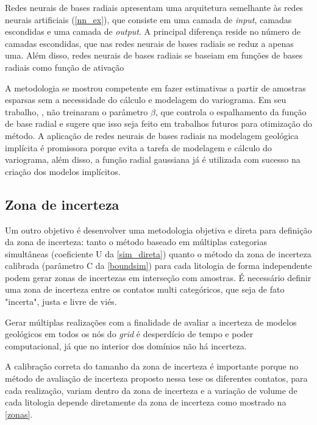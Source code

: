Redes neurais de bases radiais apresentam uma arquitetura semelhante às redes neurais artificiais (\autoref{nn_ex}), que consiste em uma camada de \textit{input}, camadas escondidas e uma camada de \textit{output}. A principal diferença reside no número de camadas escondidas, que nas redes neurais de bases radiais se reduz a apenas uma. Além disso, redes neurais de bases radiais se baseiam em funções de bases radiais como função de ativação 

A metodologia se mostrou competente em fazer estimativas a partir de amostras esparsas sem a necessidade do cálculo e modelagem do variograma. Em seu trabalho, , não treinaram o parâmetro $\beta$, que controla o espalhamento da função de base radial e sugere que isso seja feito em trabalhos futuros para otimização do método. A aplicação de redes neurais de bases radiais na modelagem geológica implícita é promissora porque evita a tarefa de modelagem e cálculo do variograma, além disso, a função radial gaussiana já é utilizada com sucesso na criação dos modelos implícitos. 

\subsection{Zona de incerteza}

Um outro objetivo é desenvolver uma metodologia objetiva e direta para definição da zona de incerteza: tanto o método baseado em múltiplas categorias simultâneas (coeficiente U da \autoref{sim_direta}) quanto o método da zona de incerteza calibrada (parâmetro C da \autoref{boundsim}) para cada litologia de forma independente podem gerar zonas de incertezas em interseção com amostras. É necessário definir uma zona de incerteza entre os contatos multi categóricos, que seja de fato "incerta", justa e livre de viés. 

Gerar múltiplas realizações com a finalidade de avaliar a incerteza de modelos geológicos em todos os nós do \textit{grid} é desperdício de tempo e poder computacional, já que no interior dos domínios não há incerteza. 

A calibração correta do tamanho da zona de incerteza é importante porque no método de avaliação de incerteza proposto nessa tese os diferentes contatos, para cada realização, variam dentro da zona de incerteza e a variação de volume de cada litologia depende diretamente da zona de incerteza como mostrado na \autoref{zonas}.


